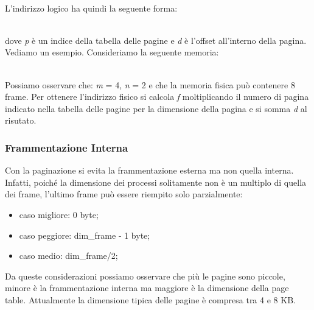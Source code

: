 \documentclass{article}
\begin{document}
			\\L’indirizzo logico ha quindi la seguente forma:
			\begin{figure}[ht!]
			\end{figure}
			\\dove \textit{p} è un indice della tabella delle pagine e
			\textit{d} è l’offset all’interno della pagina.
			\\Vediamo un esempio. Consideriamo la seguente memoria:
			\begin{figure}[ht!]
			\end{figure}
			\\Possiamo osservare che: \textit{m} = 4, \textit{n} = 2 e che la memoria fisica può contenere 8 frame. Per ottenere l'indirizzo fisico si calcola \textit{f} moltiplicando il numero di pagina indicato nella tabella delle pagine per la dimensione della pagina e si somma \textit{d} al risutato.

			\subsubsection{Frammentazione Interna}
				Con la paginazione si evita la frammentazione esterna ma non quella interna. Infatti, poiché la dimensione dei processi solitamente non è un multiplo di quella dei frame, l'ultimo frame può essere riempito solo parzialmente:
				\begin{itemize}
					\item caso migliore: 0 byte;
					\item caso peggiore: dim\_frame - 1 byte;
					\item caso medio: dim\_frame/2;
				\end{itemize}
				Da queste considerazioni possiamo osservare che più le pagine sono piccole, minore è la frammentazione interna ma maggiore è la dimensione della page table. Attualmente la dimensione tipica delle pagine è compresa tra 4 e 8 KB.
\end{document}
